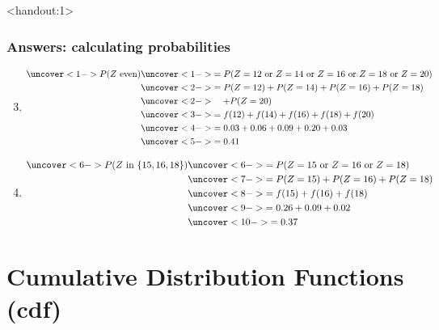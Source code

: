 \documentclass[handout]{beamer}\usepackage{graphicx, color}
\newcommand{\answers}{1}
\numberwithin{equation}{section}
\begin{document}
\begin{frame}<handout:\answers>
\frametitle{Answers: calculating probabilities} \scriptsize
\begin{enumerate}
\setcounter{enumi}{2}
\item 
\begin{align*}
\uncover<1->{P(Z \text{ even})} & \uncover<1->{= P(Z = 12 \text{ or } Z = 14 \text{ or } Z = 16 \text{ or } Z = 18 \text{ or } Z = 20)} \\
& \uncover<2->{=  P(Z = 12) +  P(Z = 14) +  P(Z = 16) +  P(Z = 18)} \\
 & \uncover<2->{\quad +   P(Z = 20)} \\
&\uncover<3->{ = f(12) + f(14) + f(16) + f(18) + f(20)} \\
& \uncover<4->{= 0.03 + 0.06 + 0.09 + 0.20 + 0.03} \\
& \uncover<5->{= 0.41}
\end{align*}

\item 
\begin{align*}
\uncover<6->{P(Z \text{ in } \{15, 16, 18\})} & \uncover<6->{= P(Z = 15 \text{ or } Z = 16 \text{ or } Z = 18)} \\
&\uncover<7->{ = P(Z = 15) + P(Z = 16) + P(Z = 18)} \\
&\uncover<8->{ = f(15) + f(16) + f(18)} \\
&\uncover<9->{ = 0.26 + 0.09 + 0.02 }\\
&\uncover<10->{ = 0.37}
\end{align*}
\end{enumerate}
\end{frame}










\section{Cumulative Distribution Functions (cdf)}
\end{document}
